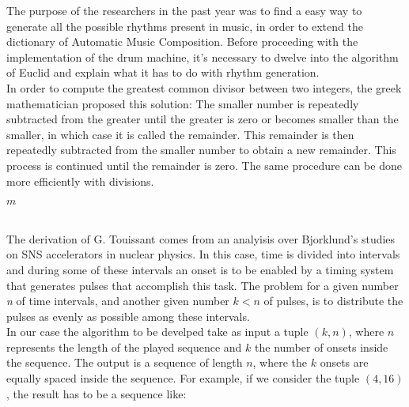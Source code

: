 \documentclass[main.tex]{subfiles}
\begin{document}
The purpose of the researchers in the past year was to find a easy way to generate all the possible rhythms present in music, in order to extend the dictionary of Automatic Music Composition\cite{Allouche:2002:AutomSeq:book}.
Before proceeding with the implementation of the drum machine, it’s necessary to dwelve into the algorithm of Euclid and explain what it has to do with rhythm generation.\\
In order to compute the greatest common divisor between two integers, the greek mathematician proposed this solution:
The smaller number is repeatedly subtracted from the greater until the greater is zero or becomes smaller than the smaller, in which case it is called the remainder. This remainder is then repeatedly subtracted from the smaller number to obtain a new remainder. This process is continued until the remainder is zero\cite{Euclid:Elements}. 
The same procedure can be done more efficiently with divisions.\\
[2mm]
\begin{algorithm}
\label{euclid}
\begin{algorithmic}[1]
\State \Return $m$
\Else
\State {}

\EndIf
\EndProcedure
\end{algorithmic}
\end{algorithm}\\
[3mm]
The derivation of G. Touissant\cite{Toussaint:2004:euclidean:rhythm} comes from an analyisis over Bjorklund's studies on SNS accelerators\cite{Bjorklund:2003:euclidean:rhythm} in nuclear physics. In this case, time is divided into intervals and during some of these intervals an onset is to be enabled by a timing system that generates pulses that accomplish this task. The problem for a given number \textit{n} of time intervals, and another given number \begin{math}k<n\end{math} of pulses, is to distribute the pulses as evenly as possible among these intervals.\\
In our case the algorithm to be develped take as input a tuple \begin{math}{(k, n)}\end{math}, where \begin{math}{n}\end{math} represents the length of the played sequence and \begin{math}{k}\end{math} the number of onsets inside the sequence. The output is a sequence of length \begin{math}{n}\end{math}, where the \begin{math}{k}\end{math} onsets are equally spaced inside the sequence. For example, if we consider the tuple \begin{math}{(4, 16)}\end{math}, the result has to be a sequence like:\\
\end{document}
